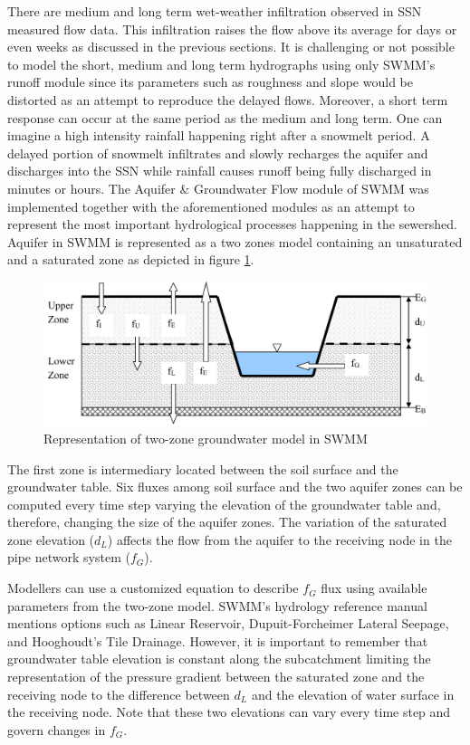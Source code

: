 There are medium and long term wet-weather infiltration observed in \acf{SSN} measured flow data. This infiltration raises the flow above its average for days or even weeks as discussed in the previous sections. It is challenging or not possible to model the short, medium and long term hydrographs using only SWMM's runoff module since its parameters such as roughness and slope would be distorted as an attempt to reproduce the delayed flows. Moreover, a short term response can occur at the same period as the medium and long term. One can imagine a high intensity rainfall happening right after a snowmelt period. A delayed portion of snowmelt infiltrates and slowly recharges the aquifer and discharges into the \ac{SSN} while rainfall causes runoff being fully discharged in minutes or hours. The Aquifer \& Groundwater Flow module of SWMM was implemented together with the aforementioned modules as an attempt to represent the most important hydrological processes happening in the sewershed. 
Aquifer in SWMM is represented as a two zones model containing an unsaturated and a saturated zone as depicted in figure \ref{fig:gwtwozoneslit}. 

\begin{figure}[h]
    \centering
	\includegraphics[scale=0.45]{figures/gwtwozoneslit.png}
	\caption{Representation of two-zone groundwater model in SWMM \cite{Rossman2016}}
	\label{fig:gwtwozoneslit}
\end{figure}

The first zone is intermediary located between the soil surface and the groundwater table. Six fluxes among soil surface and the two aquifer zones can be computed every time step varying the elevation of the groundwater table and, therefore, changing the size of the aquifer zones. The variation of the saturated zone elevation ($d_L$) affects the flow from the aquifer to the receiving node in the pipe network system ($f_G$). 

Modellers can use a customized equation to describe $f_G$ flux using available parameters from the two-zone model. SWMM's hydrology reference manual \cite{Rossman2016} mentions options such as Linear Reservoir, Dupuit-Forcheimer Lateral Seepage, and Hooghoudt's Tile Drainage. However, it is important to remember that groundwater table elevation is constant along the subcatchment limiting the representation of the pressure gradient between the saturated zone and the receiving node to the difference between $d_L$ and the elevation of water surface in the receiving node. Note that these two elevations can vary every time step and govern changes in $f_G$.


